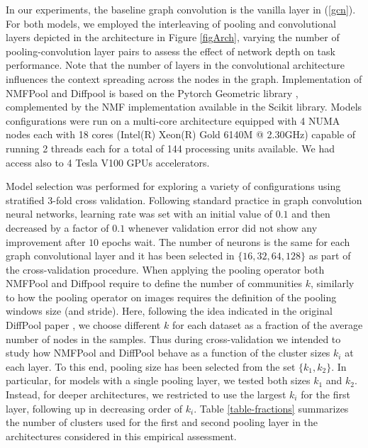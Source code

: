 \documentclass[runningheads]{llncs}
\begin{document}
In our experiments, the baseline graph convolution is the vanilla layer in (\ref{gcn}). For both models, we employed the interleaving of pooling and convolutional layers depicted in the architecture in Figure \ref{figArch}, varying the number of pooling-convolution layer pairs to assess the effect of network depth on task performance. Note that the number of layers in the convolutional architecture influences the context spreading across the nodes in the graph. Implementation of NMFPool and Diffpool is based on the Pytorch Geometric library \cite{DBLP:journals/corr/abs-1903-02428}, complemented by the NMF implementation available in the Scikit library. Models configurations were run on a multi-core architecture equipped with 4 NUMA nodes each with 18 cores (Intel(R) Xeon(R) Gold 6140M @ 2.30GHz) capable of running 2 threads each for a total of 144 processing units available. We had access also to 4 Tesla V100 GPUs accelerators.

Model selection was performed for exploring a variety of configurations using stratified 3-fold cross validation. Following standard practice in graph convolution neural networks, learning rate was set with an initial value of $0.1$ and then decreased by a factor of $0.1$ whenever validation error did not show any improvement after $10$ epochs wait. The number of neurons is the same for each graph convolutional layer and it has been selected in $\{16, 32, 64, 128\}$ as part of the cross-validation procedure. When applying the pooling operator both NMFPool and Diffpool require to define the number of communities $k$, similarly to how the pooling operator on images requires the definition of the pooling windows size (and stride). Here, following the idea indicated in the original DiffPool paper  \cite{NIPS2018_7729},  we choose different $k$ for each dataset as a fraction of the average number of nodes in the samples. Thus during cross-validation we intended to study how NMFPool and DiffPool behave as a function of the cluster sizes $k_i$ at each layer. To this end, pooling size has been selected from the set $\{k_1, k_2\}$. In particular, for models with a single pooling layer, we tested both sizes $k_1$ and $k_2$.  Instead, for deeper architectures, we restricted to use the largest $k_i$ for the first layer, following up in decreasing order of $k_i$. Table \ref{table-fractions} summarizes the number of clusters used for the first and second pooling layer in the architectures considered in this empirical assessment.
\end{document}
